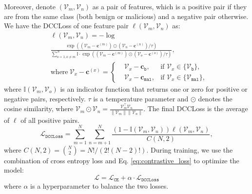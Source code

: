 Moreover, denote $(\mathcal{V}_m, \mathcal{V}_n)$ as a pair of features, which is a positive pair if they are from the same class (both benign or malicious) and a negative pair otherwise. We have the DCCLoss of one feature pair $\ell(\mathcal{V}_m, \mathcal{V}_n)$ as:
\begin{equation}
    \begin{aligned}
    &\ell\left(\mathcal{V}_m, \mathcal{V}_n\right)=-\log \\
    &\frac{\exp\left((\mathcal{V}_m-\mathbf{c}^{(m)})\odot  (\mathcal{V}_n-\mathbf{c}^{(n)})/\tau\right)}
        {\sum_{o=1, o\neq m}^{N} \mathbb{I}\cdot\exp\left((\mathcal{V}_m-\mathbf{c}^{(m)})\odot  (\mathcal{V}_o-\mathbf{c}^{(o)})/\tau\right)},\\
    & \text{where}\ \mathcal{V}_x - \mathbf{c}^{(x)}= 
    \left\{\begin{aligned}
        &\mathcal{V}_x - \mathbf{c}_\mathtt{b}, & \text{if } \mathcal{V}_x \in \{\mathcal{V}_\mathtt{b}\},\\ 
        &\mathcal{V}_x - \mathbf{c}_\mathtt{mal}, & \text{if } \mathcal{V}_x \in \{\mathcal{V}_\mathtt{mal}\},
    \end{aligned}\right.
    \end{aligned}
\end{equation}
where $\mathbb{I}(\mathcal{V}_m, \mathcal{V}_o)$ is an indicator function that returns one or zero for positive or negative pairs, respectively. $\tau$ is a temperature parameter and $\odot$ denotes the cosine similarity, where $\mathcal{V}_m\odot \mathcal{V}_n = \frac{\mathcal{V}_m^\top  \mathcal{V}_n}{\|\mathcal{V}_m\|\|\mathcal{V}_n\|}$.
The final DCCLoss is the average of $\ell$ of all positive pairs.
\begin{equation}
    \mathcal{L}_\mathtt{DCCLoss}= \sum_{m=1}^{N} \sum_{n=m+1}^{N} \frac{\left(1-\mathbb{I}(\mathcal{V}_m, \mathcal{V}_n)\right)\ell\left(\mathcal{V}_m, \mathcal{V}_n\right)}{C(N,2)},
    \label{eq:contrastive_loss}
\end{equation}
where $C(N,2)= \binom{N}{2}={N!}/({2!(N-2)!})$. 
During training, we use the combination of cross entropy loss and Eq. \ref{eq:contrastive_loss} to optimize the model:
\begin{equation}
    \mathcal{L} = \mathcal{L}_\mathtt{CE} + \alpha\cdot \mathcal{L}_\mathtt{DCCLoss}
    \label{eq:mixed_loss}
\end{equation}
where $\alpha$ is a hyperparameter to balance the two losses.

